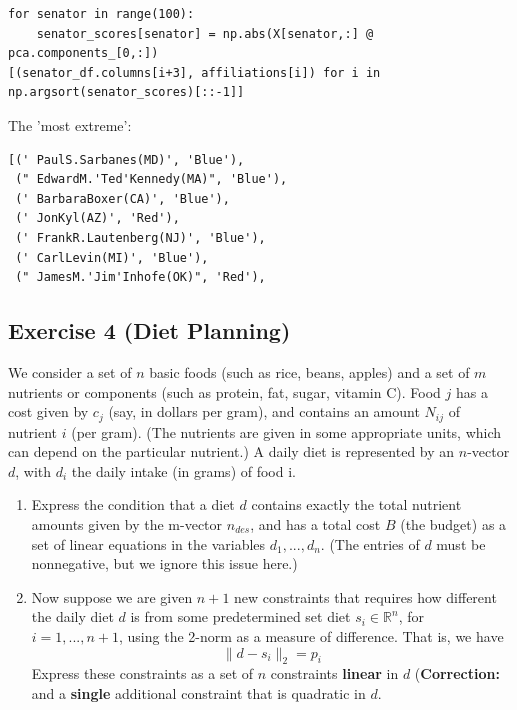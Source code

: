 \documentclass[11pt]{article}
\begin{document}
\begin{solution}
\begin{enumerate}
\begin{verbatim}
for senator in range(100):
    senator_scores[senator] = np.abs(X[senator,:] @ pca.components_[0,:])
[(senator_df.columns[i+3], affiliations[i]) for i in np.argsort(senator_scores)[::-1]]
\end{verbatim}
The 'most extreme':
\begin{verbatim}
[(' PaulS.Sarbanes(MD)', 'Blue'),
 (" EdwardM.'Ted'Kennedy(MA)", 'Blue'),
 (' BarbaraBoxer(CA)', 'Blue'),
 (' JonKyl(AZ)', 'Red'),
 (' FrankR.Lautenberg(NJ)', 'Blue'),
 (' CarlLevin(MI)', 'Blue'),
 (" JamesM.'Jim'Inhofe(OK)", 'Red'),
\end{verbatim}
\end{enumerate}
\end{solution}

\newpage
\subsection*{Exercise 4 (Diet Planning)}

We consider a set of $n$ basic foods (such as rice, beans, apples) and a set of $m$ nutrients or components (such as protein, fat, sugar, vitamin C). Food $j$ has a cost given by $c_j$ (say, in dollars per gram), and contains an amount $N_{ij}$ of nutrient $i$ (per gram). (The nutrients are given in some appropriate units, which can depend on the particular nutrient.) A daily diet is represented by an $n$-vector $d$, with $d_i$ the daily intake (in grams) of food i.

\begin{enumerate}
    \item Express the condition that a diet $d$ contains exactly the total nutrient amounts given by the m-vector $n_{des}$, and has a total cost $B$ (the budget) as a set of linear equations in the variables $d_1, ..., d_n$. (The entries of $d$ must be nonnegative, but we ignore this issue here.)

    \item Now suppose we are given $n + 1$ new constraints that requires how different the daily diet $d$ is from some predetermined set diet $s_i \in \mathbb{R}^n$, for $i = 1, ..., n+1$, using the 2-norm as a measure of difference. That is, we have
    $$
    \| d - s_i \|_2 = p_i
    $$
        Express these constraints as a set of $n$ constraints \textbf{linear} in $d$ (\textbf{Correction:} and a \textbf{single} additional constraint that is quadratic in $d$.
\end{enumerate}
\end{document}
